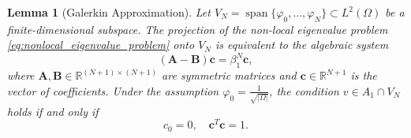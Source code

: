 \documentclass[11pt, a4paper]{article}
\theoremstyle{break}
\theoremstyle{break}
\theoremstyle{break}
\theoremstyle{break}
\theoremstyle{break}
\newtheorem{lem}{Lemma}[section]
\theoremstyle{break}
\theoremstyle{break}
\theoremstyle{break}
\theoremstyle{break}
\begin{document}
\begin{lem}[Galerkin Approximation]
\label{lem:galerkin_approximation}
Let $V_N = \operatorname{span}\{\varphi_0, \dots, \varphi_N\} \subset L^2(\Omega)$ be a finite-dimensional subspace. The projection of the non-local eigenvalue problem \eqref{eq:nonlocal_eigenvalue_problem} onto $V_N$ is equivalent to the algebraic system 
\begin{equation}
    \label{eq:matrix_system_lemma}
    (\mathbf{A} - \mathbf{B})\mathbf{c} = \beta_1^N \mathbf{c},
\end{equation}
    where $\mathbf{A}, \mathbf{B} \in \mathbb{R}^{(N+1) \times (N+1)}$ are symmetric matrices and $\mathbf{c} \in \mathbb{R}^{N+1}$ is the vector of coefficients. Under the assumption $\varphi_0 = \frac{1}{\sqrt{|\Omega|}}$, the condition $v \in A_1 \cap V_N$ holds if and only if
    \begin{equation}
        \label{eq:system_constraint_lemma}
        c_0 = 0, \quad \mathbf{c}^T\mathbf{c} = 1.
    \end{equation}
\end{lem}
\end{document}
